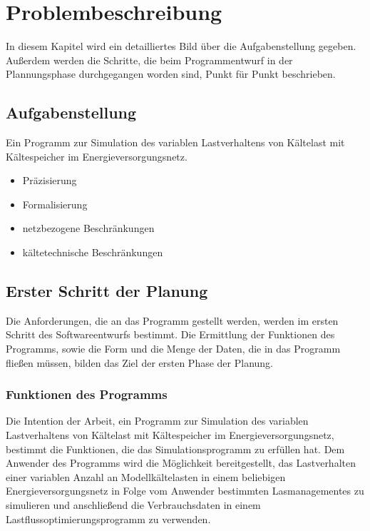 \chapter{Problembeschreibung}
\label{chap:problemstellung}
\minitoc

In diesem Kapitel wird ein detailliertes Bild über die Aufgabenstellung gegeben. Außerdem werden die Schritte, die beim
Programmentwurf in der Plannungsphase durchgegangen worden sind, Punkt für Punkt beschrieben.

\section{Aufgabenstellung}

Ein Programm zur Simulation des variablen Lastverhaltens von Kältelast mit Kältespeicher im
Energieversorgungsnetz.

\begin{itemize}
\item Präzisierung
\item Formalisierung
\end{itemize}

\begin{itemize}
\item netzbezogene Beschränkungen
\item kältetechnische Beschränkungen
\end{itemize}


\section{Erster Schritt der Planung}

Die Anforderungen, die an das Programm gestellt werden, werden im ersten Schritt des Softwareentwurfs bestimmt. Die Ermittlung
der Funktionen des Programms, sowie die Form und die Menge der Daten, die in das Programm fließen müssen, bilden das Ziel der
ersten Phase der Planung.

\subsection{Funktionen des Programms}

Die Intention der Arbeit, ein Programm zur Simulation des variablen Lastverhaltens von Kältelast mit Kältespeicher im
Energieversorgungsnetz, bestimmt die Funktionen, die das Simulationsprogramm zu erfüllen hat. Dem Anwender des Programms wird
die Möglichkeit bereitgestellt, das Lastverhalten einer variablen Anzahl an Modellkältelasten in einem beliebigen
Energieversorgungsnetz in Folge vom Anwender bestimmten Lasmanagementes zu simulieren und anschließend die Verbrauchsdaten in
einem Lastflussoptimierungsprogramm zu verwenden.

